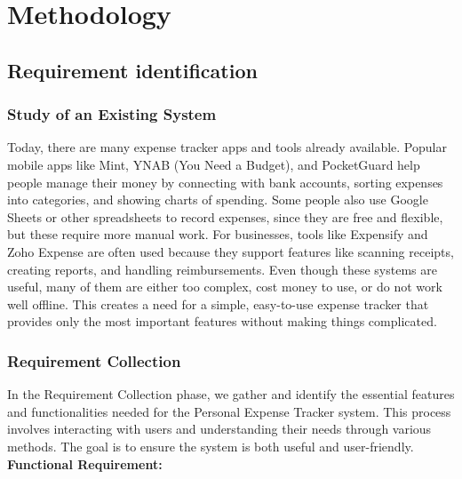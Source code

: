 \documentclass[12pt]{report} %
\begin{document}

\chapter{Methodology}

\section{Requirement identification}

\subsection{Study of an Existing System}
Today, there are many expense tracker apps and tools already available. Popular mobile apps like Mint, YNAB (You Need a Budget), and PocketGuard help people manage their money by connecting with bank accounts, sorting expenses into categories, and showing charts of spending. Some people also use Google Sheets or other spreadsheets to record expenses, since they are free and flexible, but these require more manual work. For businesses, tools like Expensify and Zoho Expense are often used because they support features like scanning receipts, creating reports, and handling reimbursements. Even though these systems are useful, many of them are either too complex, cost money to use, or do not work well offline. This creates a need for a simple, easy-to-use expense tracker that provides only the most important features without making things complicated.

\subsection{Requirement Collection}
In the Requirement Collection phase, we gather and identify the essential features and functionalities needed for the Personal Expense Tracker system. This process involves interacting with users and understanding their needs through various methods. The goal is to ensure the system is both useful and user-friendly. \\[3mm]
\newpage
\noindent
\textbf{Functional Requirement:}
\end{document}
